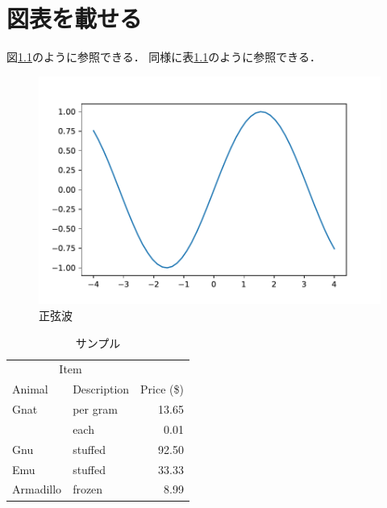 \chapter{図表を載せる}
図\ref{fig:sin}のように参照できる．
同様に表\ref{tab:demo}のように参照できる．

\begin{figure}[h]
\includegraphics[scale=0.8]{figures/sample-figure.pdf}
\centering
\caption{正弦波}
\label{fig:sin}
\end{figure}

\begin{table}[h]
\centering
\caption{サンプル}
\label{tab:demo}
\begin{tabular}{@{}llr@{}}
\toprule
\multicolumn{2}{c}{Item} &            \\ \cmidrule(r){1-2}
Animal     & Description & Price (\$) \\ \midrule
Gnat       & per gram    & 13.65      \\
           & each        & 0.01       \\
Gnu        & stuffed     & 92.50      \\
Emu        & stuffed     & 33.33      \\
Armadillo  & frozen      & 8.99       \\ \bottomrule
\end{tabular}
\end{table}
